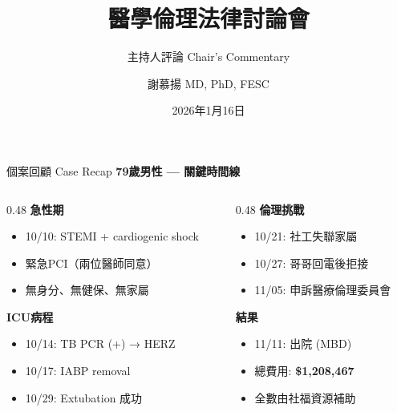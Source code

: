 \documentclass[aspectratio=169,12pt]{beamer}
\title[醫法倫討論]{醫學倫理法律討論會}
\subtitle{主持人評論 Chair's Commentary}
\author{謝慕揚 MD, PhD, FESC}
\institute{國立臺灣大學醫學院附設醫院新竹臺大分院}
\date{2026年1月16日}
\begin{document}
\begin{frame}
\titlepage
\end{frame}

\begin{frame}{個案回顧 Case Recap}
\textbf{79歲男性 — 關鍵時間線}

\begin{columns}[T]
\begin{column}{0.48\textwidth}
\textcolor{ntuhred}{\textbf{急性期}}
\begin{itemize}
    \item 10/10: STEMI + cardiogenic shock
    \item 緊急PCI（\alert{兩位醫師同意}）
    \item 無身分、無健保、無家屬
\end{itemize}

\vspace{0.3cm}
\textcolor{ethicsgreen}{\textbf{ICU病程}}
\begin{itemize}
    \item 10/14: TB PCR (+) → HERZ
    \item 10/17: IABP removal
    \item 10/29: Extubation 成功
\end{itemize}
\end{column}

\begin{column}{0.48\textwidth}
\textcolor{warningorange}{\textbf{倫理挑戰}}
\begin{itemize}
    \item 10/21: 社工失聯家屬
    \item 10/27: 哥哥回電後拒接
    \item 11/05: \alert{申訴醫療倫理委員會}
\end{itemize}

\vspace{0.3cm}
\textcolor{ntuhblue}{\textbf{結果}}
\begin{itemize}
    \item 11/11: 出院 (MBD)
    \item 總費用: \textbf{\$1,208,467}
    \item 全數由社福資源補助
\end{itemize}
\end{column}
\end{columns}
\end{frame}
\end{document}
